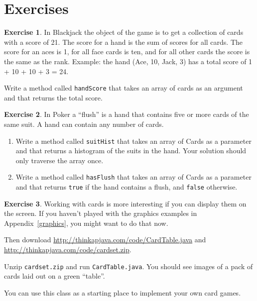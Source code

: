 \documentclass[12pt]{book}
\theoremstyle{definition}
\newtheorem{excz}{Exercise}[chapter]
\newenvironment{exercise}{\bigskip\begin{excz}\mbox{}}{\end{excz}}
\begin{document}
\section{Exercises}

\begin{exercise}
In Blackjack the object of the game is to get a collection of cards
with a score of 21.  The score for a hand is the sum of scores for all
cards.  The score for an aces is 1, for all face cards is ten, and
for all other cards the score is the same as the rank.  Example: the
hand (Ace, 10, Jack, 3) has a total score of 1 + 10 + 10 + 3 = 24.

Write a method called {\tt handScore} that takes an array of cards as
an argument and that returns the total score.
\end{exercise}


\begin{exercise}
In Poker a ``flush'' is a hand that contains five
or more cards of the same suit.  A hand can contain any number of cards.

\begin{enumerate}

\item Write a method called {\tt suitHist} that takes an array of Cards as a
parameter and that returns a histogram of the suits in the hand.
Your solution should only traverse the array once.

\item Write a method called {\tt hasFlush} that takes an array of Cards as a
parameter and that returns {\tt true} if the hand contains a flush,
and {\tt false} otherwise.

\end{enumerate}

\end{exercise}


\begin{exercise}
Working with cards is more interesting if you can display them on
the screen.  If you haven't played with the graphics examples in
Appendix~\ref{graphics}, you might want to do that now.

Then download
\url{http://thinkapjava.com/code/CardTable.java}
and
\url{http://thinkapjava.com/code/cardset.zip}.

Unzip {\tt cardset.zip} and run {\tt CardTable.java}.  You
should see images of a pack of cards laid out on a green ``table''.

You can use this class as a starting place to implement your own
card games.
\end{exercise}
\end{document}
